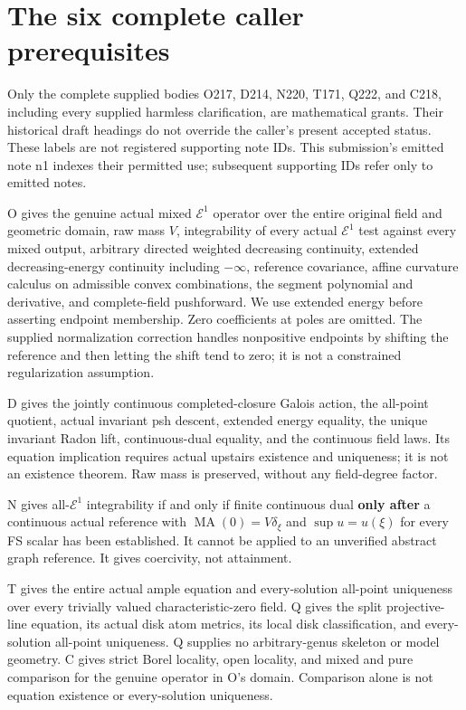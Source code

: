 \documentclass[
  11pt,
]{article}
\begin{document}
\section{The six complete caller
prerequisites}\label{the-six-complete-caller-prerequisites}

Only the complete supplied bodies O217, D214, N220, T171, Q222, and
C218, including every supplied harmless clarification, are mathematical
grants. Their historical draft headings do not override the caller's
present accepted status. These labels are not registered supporting note
IDs. This submission's emitted note n1 indexes their permitted use;
subsequent supporting IDs refer only to emitted notes.

O gives the genuine actual mixed \(\mathcal E^1\) operator over the
entire original field and geometric domain, raw mass \(V\),
integrability of every actual \(\mathcal E^1\) test against every mixed
output, arbitrary directed weighted decreasing continuity, extended
decreasing-energy continuity including \(-\infty\), reference
covariance, affine curvature calculus on admissible convex combinations,
the segment polynomial and derivative, and complete-field pushforward.
We use extended energy before asserting endpoint membership. Zero
coefficients at poles are omitted. The supplied normalization correction
handles nonpositive endpoints by shifting the reference and then letting
the shift tend to zero; it is not a constrained regularization
assumption.

D gives the jointly continuous completed-closure Galois action, the
all-point quotient, actual invariant psh descent, extended energy
equality, the unique invariant Radon lift, continuous-dual equality, and
the continuous field laws. Its equation implication requires actual
upstairs existence and uniqueness; it is not an existence theorem. Raw
mass is preserved, without any field-degree factor.

N gives all-\(\mathcal E^1\) integrability if and only if finite
continuous dual \textbf{only after} a continuous actual reference with
\(\operatorname{MA}(0)=V\delta_\xi\) and \(\sup u=u(\xi)\) for every FS
scalar has been established. It cannot be applied to an unverified
abstract graph reference. It gives coercivity, not attainment.

T gives the entire actual ample equation and every-solution all-point
uniqueness over every trivially valued characteristic-zero field. Q
gives the split projective-line equation, its actual disk atom metrics,
its local disk classification, and every-solution all-point uniqueness.
Q supplies no arbitrary-genus skeleton or model geometry. C gives strict
Borel locality, open locality, and mixed and pure comparison for the
genuine operator in O's domain. Comparison alone is not equation
existence or every-solution uniqueness.
\end{document}
